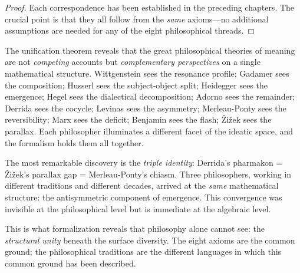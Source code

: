 \begin{proof}
Each correspondence has been established in the preceding chapters. The
crucial point is that they all follow from the \emph{same} axioms---no
additional assumptions are needed for any of the eight philosophical threads.
\end{proof}

\begin{interpretation}
\label{interp:unity}
The unification theorem reveals that the great philosophical theories of
meaning are not \emph{competing} accounts but \emph{complementary perspectives}
on a single mathematical structure. Wittgenstein sees the resonance profile;
Gadamer sees the composition; Husserl sees the subject-object split; Heidegger
sees the emergence; Hegel sees the dialectical decomposition; Adorno sees the
remainder; Derrida sees the cocycle; Levinas sees the asymmetry;
Merleau-Ponty sees the reversibility; Marx sees the deficit; Benjamin sees
the flash; \v{Z}i\v{z}ek sees the parallax. Each
philosopher illuminates a different facet of the ideatic space, and the
formalism holds them all together.

The most remarkable discovery is the \emph{triple identity}: Derrida's
pharmakon = \v{Z}i\v{z}ek's parallax gap = Merleau-Ponty's chiasm. Three
philosophers, working in different traditions and different decades, arrived
at the \emph{same} mathematical structure: the antisymmetric component of
emergence. This convergence was invisible at the philosophical level but
is immediate at the algebraic level.

This is what formalization reveals that philosophy alone cannot see: the
\emph{structural unity} beneath the surface diversity. The eight axioms are the
common ground; the philosophical traditions are the different languages in
which this common ground has been described.
\end{interpretation}

